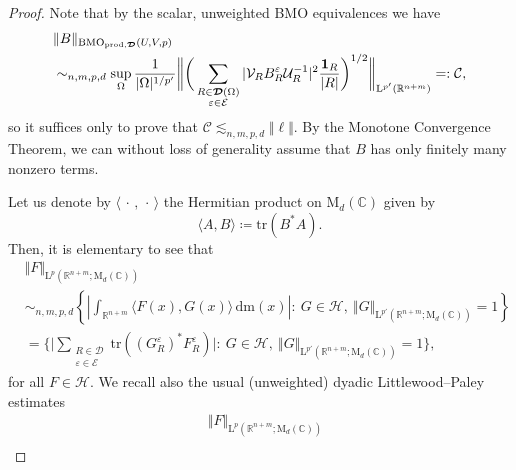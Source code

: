 \documentclass{article}
\theoremstyle{definition}
\theoremstyle{remark}
\numberwithin{equation}{section}
\newcommand{\mathdm}{\,\mathrm{dm}}
\newcommand{\cC}{\mathcal{C}}
\newcommand{\cE}{\mathcal{E}}
\newcommand{\cH}{\mathcal{H}}
\newcommand{\cU}{\mathcal{U}}
\newcommand{\cV}{\mathcal{V}}
\newcommand{\bfD}{\bm{\mathcal{D}}}
\newcommand{\e}{\varepsilon}
\newcommand{\reals}{\mathbb{R}}
\newcommand{\complex}{\mathbb{C}}
\newcommand{\Lp}[1]{\mathrm{L}^{#1}}
\newcommand{\1}{\mathbf{1}}
\newcommand{\var}{\,\cdot\,}
\newcommand{\tr}{\mathrm{tr}}
\newcommand{\BMOprodD}{\ensuremath\text{BMO}_{\text{prod},\bfD}}
\begin{document}
\begin{proof}
        Note that by the scalar, unweighted BMO equivalences we have
        \begin{align}
            \label{eq:BMOp}
            \nonumber&\Vert B\Vert_{\BMOprodD(U,V,p)}\\
            &\sim_{n,m,p,d}\sup_{\Omega}\frac{1}{|\Omega|^{1/p'}}\bigg\Vert\bigg(\sum_{\substack{R\in\bfD(\Omega)\\\e\in\cE}}|\cV_{R}B_{R}^{\e}\cU_{R}^{-1}|^2\frac{\1_{R}}{|R|}\bigg)^{1/2}\bigg\Vert_{\Lp{p'}(\reals^{n+m})}=:\cC,
        \end{align}
        so it suffices only to prove that $\cC\lesssim_{n,m,p,d}\Vert\ell\Vert.$ By the Monotone Convergence Theorem, we can without loss of generality assume that $B$ has only finitely many nonzero terms.

        Let us denote by $\langle\var,\var\rangle$ the Hermitian product on $\mathrm{M}_{d}(\complex)$ given by
        \begin{equation*}
            \langle A,B\rangle\coloneq \tr(B^{\ast}A).
        \end{equation*}
        Then, it is elementary to see that
        \begin{align}
            \label{Riesz representation}
            \nonumber&\Vert F\Vert_{\Lp{p}(\reals^{n+m};\mathrm{M}_{d}(\complex))}\\
            \nonumber&\sim_{n,m,p,d}\left\{\left|\int_{\reals^{n+m}}\langle F(x),G(x)\rangle\mathdm(x)\right|:~ G\in\cH,~\Vert G\Vert_{\Lp{p'}(\reals^{n+m};\mathrm{M}_{d}(\complex))}=1\right\}\\
            &=\bigg\{\bigg|\sum_{\substack{R\in\bfD\\\e\in\cE}}\tr((G^{\e}_{R})^{\ast}F_{R}^{\e})\bigg|:~ G\in\cH,~\Vert G\Vert_{\Lp{p'}(\reals^{n+m};\mathrm{M}_{d}(\complex))}=1\bigg\},
        \end{align}
        for all $F\in\cH.$ We recall also the usual (unweighted) dyadic Littlewood--Paley estimates
        \begin{align}
            \label{Littlewood-Paley}
            \nonumber&\Vert F\Vert_{\Lp{p}(\reals^{n+m};\mathrm{M}_{d}(\complex))}\\

\end{align}
\end{proof}
\end{document}
